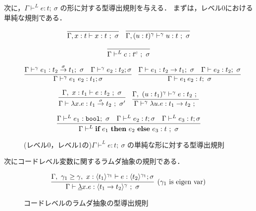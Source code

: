 次に，$\Gamma \vdash^{L} e : t ;~\sigma$ の形に対する型導出規則を与える．
まずは，レベル0における単純な規則である．

\begin{figure}[H]
  \centering
  \[
    \infer
    {\Gamma, x : t \vdash x : t ~;~ \sigma}
    {}
    \quad
    \infer
    {\Gamma, (u : t)^\gamma \vdash^\gamma u : t ~;~ \sigma}
    {}
  \]

  \[
    \infer
    {\Gamma \vdash^{L} c : t^c ~;~\sigma}
    {}
  \]

  \[
    \infer
    {\Gamma \vdash^{\gamma} e_1~ e_2 : t_1 ; \sigma}
    {\Gamma \vdash^{\gamma} e_1 : \funT{t_2}{t_1}{\sigma};~ \sigma
      & \Gamma \vdash^{\gamma} e_2 : t_2  ; \sigma
    }
    \quad
    \infer
    {\Gamma \vdash e_1 \, e_2 : t;~\sigma}
    {\Gamma \vdash e_1 : t_2 \to t_1;~\sigma
      &\Gamma \vdash e_2 : t_2;~\sigma
    }
  \]

  \[
    \infer
    {\Gamma \vdash \fun{x}{e} : \funT{t_1}{t_2}{\sigma} ~;~\sigma'}
    {\Gamma,~x : t_1 \vdash e : t_2 ~;~ \sigma}
    \quad
    \infer
    {\Gamma \vdash^\gamma \fun{u}{e} : \funT{t_1}{t_2}{} ~;~ }
    {\Gamma,~(u : t_1)^\gamma \vdash^\gamma e : t_2 ~;~  }
  \]

  \[
    \infer
    {\Gamma \vdash^{L} \ift{e_1}{e_2}{e_3} : t ~;~ \sigma}
    {\Gamma \vdash^{L} e_1 : \boolT ;~ \sigma
      & \Gamma \vdash^{L} e_2 : t ; \sigma
      & \Gamma \vdash^{L} e_3 : t ; \sigma}
  \]
  \caption{(レベル0，レベル1の)$\Gamma \vdash^{L} e : t ;~\sigma$ の単純な形に対する型導出規則}
  \label{fig:gvs_rule}
\end{figure}


次にコードレベル変数に関するラムダ抽象の規則である．

\begin{figure}[H]
  \centering
  \[
    \infer[(\gamma_1~\text{is eigen var})]
    {\Gamma \vdash \cfun{x}{e} : \codeT{t_1\to t_2}{\gamma} ~;~ \sigma}
    {\Gamma,~\gamma_1 \ord \gamma,~x:\codeT{t_1}{\gamma_1} \vdash e
      : \codeT{t_2}{\gamma_1}; \sigma}
  \]
  \caption{コードレベルのラムダ抽象の型導出規則}
  \label{fig:code_abs_type_rule}
\end{figure}


